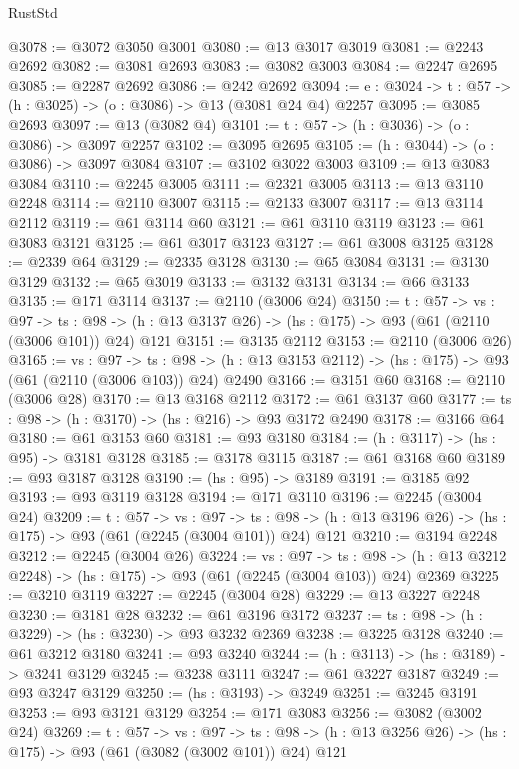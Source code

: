 \begin{lexlean}{RustStd}
\begin{coremodule}
@3078 := @3072 @3050 @3001
@3080 := @13 @3017 @3019
@3081 := @2243 @2692
@3082 := @3081 @2693
@3083 := @3082 @3003
@3084 := @2247 @2695
@3085 := @2287 @2692
@3086 := @242 @2692
@3094 := {e : @3024} -> {t : @57} -> (h : @3025) -> (o : @3086) -> @13 (@3081 @24 @4) @2257
@3095 := @3085 @2693
@3097 := @13 (@3082 @4)
@3101 := {t : @57} -> (h : @3036) -> (o : @3086) -> @3097 @2257
@3102 := @3095 @2695
@3105 := (h : @3044) -> (o : @3086) -> @3097 @3084
@3107 := @3102 @3022 @3003
@3109 := @13 @3083 @3084
@3110 := @2245 @3005
@3111 := @2321 @3005
@3113 := @13 @3110 @2248
@3114 := @2110 @3007
@3115 := @2133 @3007
@3117 := @13 @3114 @2112
@3119 := @61 @3114 @60
@3121 := @61 @3110 @3119
@3123 := @61 @3083 @3121
@3125 := @61 @3017 @3123
@3127 := @61 @3008 @3125
@3128 := @2339 @64
@3129 := @2335 @3128
@3130 := @65 @3084
@3131 := @3130 @3129
@3132 := @65 @3019
@3133 := @3132 @3131
@3134 := @66 @3133
@3135 := @171 @3114
@3137 := @2110 (@3006 @24)
@3150 := {t : @57} ->
  {vs : @97} ->
  {ts : @98} -> (h : @13 @3137 @26) -> (hs : @175) -> @93 (@61 (@2110 (@3006 @101)) @24) @121
@3151 := @3135 @2112
@3153 := @2110 (@3006 @26)
@3165 := {vs : @97} ->
  {ts : @98} -> (h : @13 @3153 @2112) -> (hs : @175) -> @93 (@61 (@2110 (@3006 @103)) @24) @2490
@3166 := @3151 @60
@3168 := @2110 (@3006 @28)
@3170 := @13 @3168 @2112
@3172 := @61 @3137 @60
@3177 := {ts : @98} -> (h : @3170) -> (hs : @216) -> @93 @3172 @2490
@3178 := @3166 @64
@3180 := @61 @3153 @60
@3181 := @93 @3180
@3184 := (h : @3117) -> (hs : @95) -> @3181 @3128
@3185 := @3178 @3115
@3187 := @61 @3168 @60
@3189 := @93 @3187 @3128
@3190 := (hs : @95) -> @3189
@3191 := @3185 @92
@3193 := @93 @3119 @3128
@3194 := @171 @3110
@3196 := @2245 (@3004 @24)
@3209 := {t : @57} ->
  {vs : @97} ->
  {ts : @98} -> (h : @13 @3196 @26) -> (hs : @175) -> @93 (@61 (@2245 (@3004 @101)) @24) @121
@3210 := @3194 @2248
@3212 := @2245 (@3004 @26)
@3224 := {vs : @97} ->
  {ts : @98} -> (h : @13 @3212 @2248) -> (hs : @175) -> @93 (@61 (@2245 (@3004 @103)) @24) @2369
@3225 := @3210 @3119
@3227 := @2245 (@3004 @28)
@3229 := @13 @3227 @2248
@3230 := @3181 @28
@3232 := @61 @3196 @3172
@3237 := {ts : @98} -> (h : @3229) -> (hs : @3230) -> @93 @3232 @2369
@3238 := @3225 @3128
@3240 := @61 @3212 @3180
@3241 := @93 @3240
@3244 := (h : @3113) -> (hs : @3189) -> @3241 @3129
@3245 := @3238 @3111
@3247 := @61 @3227 @3187
@3249 := @93 @3247 @3129
@3250 := (hs : @3193) -> @3249
@3251 := @3245 @3191
@3253 := @93 @3121 @3129
@3254 := @171 @3083
@3256 := @3082 (@3002 @24)
@3269 := {t : @57} ->
  {vs : @97} ->
  {ts : @98} -> (h : @13 @3256 @26) -> (hs : @175) -> @93 (@61 (@3082 (@3002 @101)) @24) @121

\end{coremodule}
\end{lexlean}
